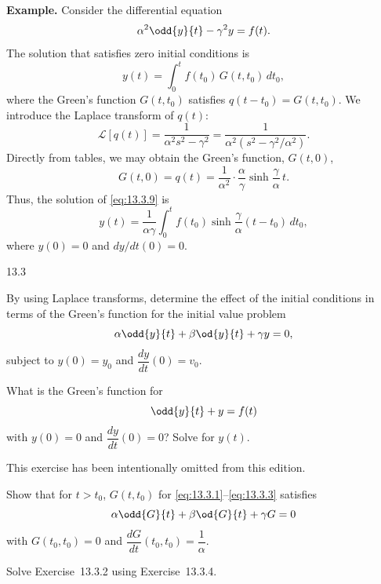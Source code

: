 \textbf{Example.}
Consider the differential equation
\begin{equation}
\alpha^2\odd{y}{t} - \gamma^2 y = f(t).
\label{eq:13.3.9}
\end{equation}
The solution that satisfies zero initial conditions is
\[
y(t) = \int_0^t f(t_0)\,G(t,t_0)\,dt_0,
\]
where the Green's function $G(t,t_0)$ satisfies $q(t-t_0)=G(t,t_0)$.  We introduce the Laplace transform of $q(t)$:
\[
\mathcal{L}[q(t)] = \frac{1}{\alpha^2 s^2 - \gamma^2}
               = \frac{1}{\alpha^2(s^2 - \gamma^2/\alpha^2)}.
\]
Directly from tables, we may obtain the Green's function, $G(t,0)$,
\[
G(t,0) = q(t) = \frac{1}{\alpha^2}\cdot\frac{\alpha}{\gamma}\sinh\frac{\gamma}{\alpha}\,t.
\]
Thus, the solution of \eqref{eq:13.3.9} is
\begin{equation}
y(t) = \frac{1}{\alpha\gamma}\int_0^t f(t_0)\sinh\frac{\gamma}{\alpha}(t-t_0)\,dt_0,
\label{eq:13.3.10}
\end{equation}
where $y(0) = 0$ and $dy/dt(0) = 0$.

\begin{exercises}{13.3}

\item By using Laplace transforms, determine the effect of the initial conditions in terms of the Green's function for the initial value problem
\[
\alpha\odd{y}{t} + \beta\od{y}{t} + \gamma y = 0,
\]
subject to $y(0) = y_0$ and $\dfrac{dy}{dt}(0) = v_0$.

\item[\starred 13.3.2.] What is the Green's function for
\[
\odd{y}{t} + y = f(t)
\]
with $y(0) = 0$ and $\dfrac{dy}{dt}(0) = 0$?  Solve for $y(t)$.

\item This exercise has been intentionally omitted from this edition.

\item Show that for $t > t_0$, $G(t,t_0)$ for \eqref{eq:13.3.1}--\eqref{eq:13.3.3} satisfies
\[
\alpha\odd{G}{t} + \beta\od{G}{t} + \gamma G = 0
\]
with $G(t_0,t_0) = 0$ and $\dfrac{dG}{dt}(t_0,t_0) = \dfrac{1}{\alpha}$.

\item Solve Exercise~13.3.2 using Exercise~13.3.4.

\end{exercises}
